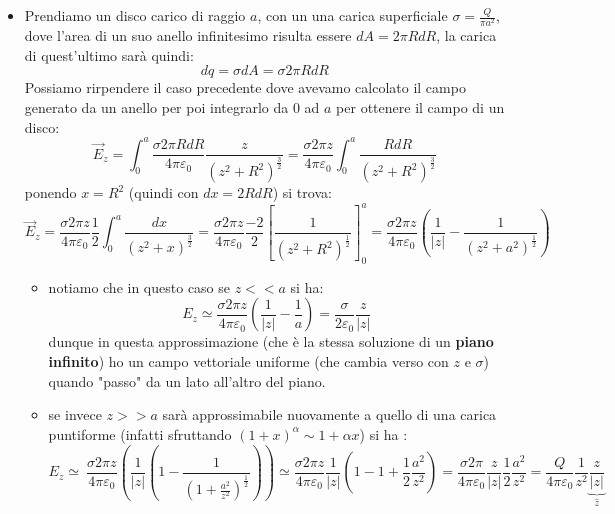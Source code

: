 \documentclass{book}
\begin{document}
\begin{itemize}
\begin{itemize}
\end{itemize}
\item Prendiamo un disco carico di raggio $a$, con un una carica superficiale $\sigma = \frac{Q}{\pi a^2}$, dove l'area di un suo anello infinitesimo risulta essere $dA = 2\pi R dR$, la carica di quest'ultimo sarà quindi:
$$
dq = \sigma dA= \sigma 2 \pi R dR
$$ 
Possiamo rirpendere il caso precedente dove avevamo calcolato il campo generato da un anello per poi integrarlo da 0 ad $a$ per ottenere il campo di un disco:
$$
\vec{E}_z= \int_0^a \frac{\sigma 2 \pi R dR}{4 \pi \varepsilon_0} \frac{z}{\left(z^2 + R^2 \right)^{\frac{3}{2}}} = \frac{\sigma 2 \pi z }{4 \pi \varepsilon_0}  \int_0^a \frac{R dR}{\left(z^2 + R^2 \right)^{\frac{3}{2}}} 
$$
ponendo $x=R^2$ (quindi con $dx = 2R dR$) si trova:
$$
\vec{E}_z = \frac{\sigma 2 \pi z }{4 \pi \varepsilon_0} \frac{1}{2}  \int_0^a \frac{dx}{\left(z^2 + x \right)^{\frac{3}{2}}} = 
\frac{\sigma 2 \pi z }{4 \pi \varepsilon_0} \frac{-2}{2}  \left[  \frac{1}{\left(z^2 + R^2 \right)^{\frac{1}{2}}} \right]_0^a
= 
\frac{\sigma 2 \pi z }{4 \pi \varepsilon_0} \left(  \frac{1}{|z|} - \frac{1}{\left(z^2 + a^2 \right)^{\frac{1}{2}}} \right)
$$
\begin{itemize}
    \item notiamo che in questo caso se $z<<a$ si ha:
    $$
    E_z \simeq \frac{\sigma 2 \pi z }{4 \pi \varepsilon_0} \left(  \frac{1}{|z|} - \frac{1}{a} \right) = \frac{\sigma}{2 \varepsilon_0} \frac{z}{|z|} 
    $$
    dunque in questa approssimazione (che è la stessa soluzione di un \textbf{piano infinito}) ho un campo vettoriale uniforme (che cambia verso con $z$ e $\sigma$) quando "passo" da un lato all'altro del piano.
    \item se invece $z>>a$ sarà approssimabile nuovamente a quello di una carica puntiforme (infatti sfruttando $(1+x)^\alpha \sim 1 + \alpha x$) si ha :
    $$
    E_z \simeq\ \frac{\sigma 2 \pi z }{4 \pi \varepsilon_0} \left(  \frac{1}{|z|}  \left( 1 -  \frac{1}{\left(1 + \frac{a^2}{z^2} \right)^{\frac{1}{2}}} \right) \right) \simeq  \frac{\sigma 2 \pi z }{4 \pi \varepsilon_0} \frac{1}{|z|} \left( 1-1 + \frac{1}{2} \frac{a^2}{z^2}\right) =  \frac{\sigma 2 \pi }{4 \pi \varepsilon_0} \frac{z}{|z|} \frac{1}{2} \frac{a^2}{z^2} = \frac{Q}{4\pi \varepsilon_0} \frac{1}{z^2} \underbrace{\frac{z}{|z|}}_{\hat{z}}
    $$

    
\end{itemize}


\end{itemize}
\end{document}
